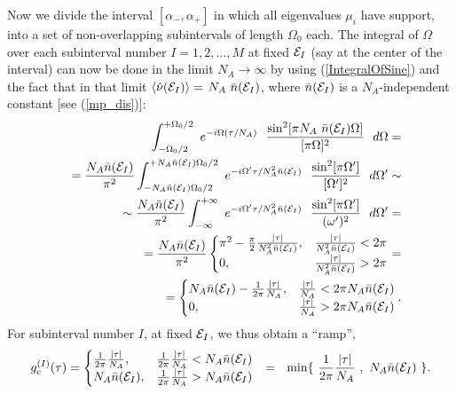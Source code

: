\documentclass[aps,prb,preprint,onecolumn,amsmath,amssymb,superscriptaddress,eqsecnum,floatfix,scrartcl]{revtex4-1}
\begin{document}
Now we divide the interval $[\alpha_-, \alpha_+]$ in which all eigenvalues $\mu_i$
have support, into a set of 
non-overlapping subintervals  
of length $\Omega_0$ each. 
The integral
of $\Omega$ over each subinterval  number $I=1, 2, ..., M$ at fixed ${\cal E}_I$ (say at the center of the interval) can now be done
in the limit $N_A \to \infty$ by using 
(\ref{IntegralOfSine}) and  the fact that in that limit $\langle {\hat \nu }({\cal E}_I)\rangle=$
$N_A \ \bar{n}({\cal E}_I)$,  where $\bar{n}({\cal E}_I)$ is a $N_A$-independent constant [see (\ref{mp_dis})]:
\begin{eqnarray}
\nonumber
&&
\int_{-\Omega_0/2}^{+\Omega_0/2}
\ e^{-i\Omega (\tau/N_A)} \ \ 
{\sin^2[\pi N_A \  \bar{n}({\cal E}_I) \Omega]\over
[\pi \Omega]^2} \ \ d\Omega =  \\ \nonumber
&&
= 
{N_A \bar{n}({\cal E}_I) \over \pi^2}
\int_{-N_A \bar{n}({\cal E}_I)\Omega_0/2}^{+N_ A\bar{n}({\cal E}_I) \Omega_0/2}
\ e^{-i\Omega'   \tau/  N^2_A\bar{n}({\cal E}_I) }\  \ 
{\sin^2[\pi  \Omega']\over
[\Omega']^2} \  \ d\Omega' \sim \\ \nonumber
&& \sim 
{N_A \bar{n}({\cal E}_I) \over \pi^2}
\int_{-\infty}^{+\infty}
\ e^{-i\Omega' \tau/  N^2_A \bar{n}({\cal E}_I) }\  \ 
{\sin^2[\pi  \Omega']\over
(\omega')^2} \ \ d\Omega'  = \\ \nonumber 
&&
=
{N_A \bar{n}({\cal E}_I)\over \pi^2}
\begin{cases} \pi^2 - {\pi\over 2}  \frac{|\tau|}{N_A^2 \bar{n}({\cal E}_I)}, & 
\frac{|\tau|}{N_A^2 \bar{n}({\cal E}_I)}   < 2\pi \\ 
0, &   \frac{|\tau|}{N_A^2 \bar{n}({\cal E}_I)}   > 2\pi  \end{cases} =
 \\ \nonumber
&&
=
\begin{cases} N_A \bar{n}({\cal E}_I)   - {1\over 2\pi}  \frac{|\tau|}{N_A}, & \frac{|\tau|}{N_A }   < 
2\pi  N_A\bar{n}({\cal E}_I) \\ 
0, &   \frac{|\tau|}{N_A }   > 2\pi  N_A \bar{n}({\cal E}_I)
 \end{cases}.
\end{eqnarray}
 For  subinterval number $I$,  at fixed ${\cal E}_I$, we thus  obtain a ``ramp'',
\begin{eqnarray}
\label{RampNumberI}
g_c^{(I)}(\tau)=
\begin{cases} {1\over 2\pi}  \frac{|\tau|}{N_A}, & {1\over 2 \pi} \frac{|\tau|}{N_A }   <   N_A\bar{n}({\cal E}_I) \\ 
N_A\bar{n}({\cal E}_I), &   {1\over 2\pi} \frac{|\tau|}{N_A }   >   N_A\bar{n}({\cal E}_I)
 \end{cases}
\bigskip
 \ \ = \ \  {\rm min}\{
\  {1\over 2\pi}  \frac{|\tau|}{N_A} \ , \ N_A\bar{n}({\cal E}_I) \  \}.
\end{eqnarray}
\end{document}
